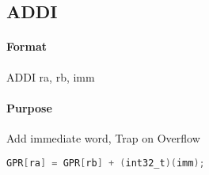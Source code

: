 \subsection{ADDI}


\paragraph{Format} ADDI ra, rb, imm

\paragraph{Purpose} Add immediate word, Trap on Overflow

\begin{lstlisting}[language=C]
    GPR[ra] = GPR[rb] + (int32_t)(imm);
\end{lstlisting}